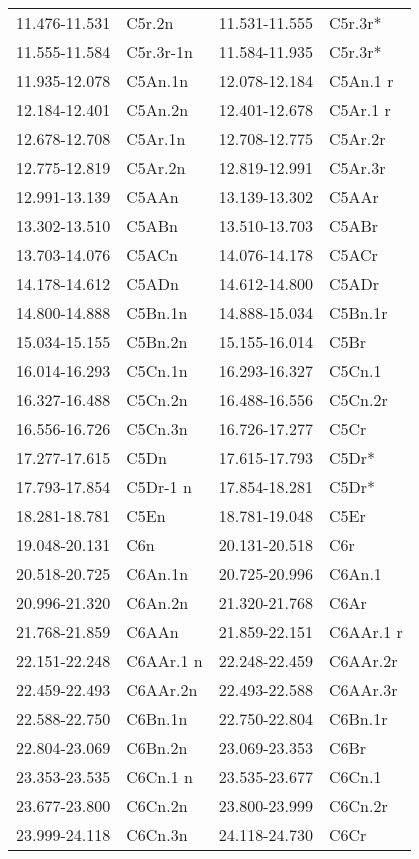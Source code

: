 \begin{center}
\begin{longtable}{ll|ll}
11.476-11.531 & C5r.2n & 11.531-11.555 & C5r.3r*\\
11.555-11.584 & C5r.3r-1n & 11.584-11.935 & C5r.3r*\\
11.935-12.078 & C5An.1n & 12.078-12.184 & C5An.1 r\\
12.184-12.401 & C5An.2n & 12.401-12.678 & C5Ar.1 r\\
12.678-12.708 & C5Ar.1n & 12.708-12.775 & C5Ar.2r\\
12.775-12.819 & C5Ar.2n & 12.819-12.991 & C5Ar.3r\\
12.991-13.139 & C5AAn & 13.139-13.302 & C5AAr\\
13.302-13.510 & C5ABn & 13.510-13.703 & C5ABr\\
13.703-14.076 & C5ACn & 14.076-14.178 & C5ACr\\
14.178-14.612 & C5ADn & 14.612-14.800 & C5ADr\\
14.800-14.888 & C5Bn.1n & 14.888-15.034 & C5Bn.1r\\
15.034-15.155 & C5Bn.2n & 15.155-16.014 & C5Br\\
16.014-16.293 & C5Cn.1n & 16.293-16.327 & C5Cn.1\\
16.327-16.488 & C5Cn.2n & 16.488-16.556 & C5Cn.2r\\
16.556-16.726 & C5Cn.3n & 16.726-17.277 & C5Cr\\
17.277-17.615 & C5Dn & 17.615-17.793 & C5Dr*\\
17.793-17.854 & C5Dr-1 n & 17.854-18.281 & C5Dr*\\
18.281-18.781 & C5En & 18.781-19.048 & C5Er\\
19.048-20.131 & C6n & 20.131-20.518 & C6r\\
20.518-20.725 & C6An.1n & 20.725-20.996 & C6An.1\\
20.996-21.320 & C6An.2n &  21.320-21.768 & C6Ar\\
21.768-21.859 & C6AAn & 21.859-22.151 & C6AAr.1 r\\
22.151-22.248 & C6AAr.1 n & 22.248-22.459 & C6AAr.2r\\
22.459-22.493 & C6AAr.2n & 22.493-22.588 & C6AAr.3r\\
22.588-22.750 & C6Bn.1n & 22.750-22.804 & C6Bn.1r\\
22.804-23.069 & C6Bn.2n & 23.069-23.353 & C6Br\\
23.353-23.535 & C6Cn.1 n & 23.535-23.677 & C6Cn.1\\
23.677-23.800 & C6Cn.2n & 23.800-23.999 & C6Cn.2r\\
23.999-24.118 & C6Cn.3n & 24.118-24.730 & C6Cr\\

\end{longtable}
\end{center}
